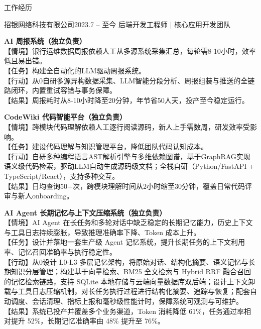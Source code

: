 \documentclass{resume}
\begin{document}
\begin{rSection}{工作经历}

\begin{rSubsection}{招银网络科技有限公司}{2023.7 -- 至今}
{后端开发工程师 | 核心应用开发团队}

\item \textbf{AI 周报系统（独立负责）} \\
【情境】银行运维数据周报依赖人工从多源系统采集汇总，每轮需8-10小时，效率低且易出错。\\
【任务】构建全自动化的LLM驱动周报系统。\\
【行动】从0自研多源异构数据采集、LLM智能分段分析、周报组装与推送的全链路闭环，内置重试容错与事务保障。\\
【结果】周报耗时从8-10小时降至20分钟，年节省50人天，投产至今稳定运行。

\item \textbf{CodeWiki 代码智能平台（独立负责）} \\
【情境】跨模块代码理解依赖人工逐行阅读源码，新人上手需数周，研发效率受影响。\\
【任务】建设代码理解与知识管理平台，降低团队代码认知成本。\\
【行动】自研多种编程语言AST解析引擎与多维依赖图谱，基于GraphRAG实现语义级代码检索，驱动LLM自动生成源码级文档；全栈自研（Python/FastAPI + TypeScript/React），支持多种交互。\\
【结果】日均查询50+次，跨模块理解时间从2小时缩至30分钟，覆盖日常代码评审与新人onboarding。

\item \textbf{AI Agent 长期记忆与上下文压缩系统（独立负责）} \\
【情境】AI Agent 在长任务和多轮对话中缺乏稳定的长期记忆能力，历史上下文与工具日志持续膨胀，导致推理准确率下降、Token 成本上升。\\
【任务】设计并落地一套生产级 Agent 记忆系统，提升长期任务的上下文利用率、记忆召回准确率与执行稳定性。\\
【行动】从0设计 L0-L3 多层记忆架构，将原始对话、结构化摘要、语义记忆与长期知识分层管理；构建基于向量检索、BM25 全文检索与 Hybrid RRF 融合召回的记忆检索链路，支持 SQLite 本地存储与云端向量数据库双后端；设计上下文卸载与工具日志压缩机制，对长任务执行过程进行结构化摘要、追踪与恢复；配套自动调度、会话清理、指标上报和毫秒级性能计时，保障系统可观测与可维护。\\
【结果】系统已投产并覆盖多个业务渠道，Token 消耗降低 61\%，任务通过率相对提升 52\%，长期记忆准确率由 48\% 提升至 76\%。
\end{rSubsection}

\end{rSection}
\end{document}

